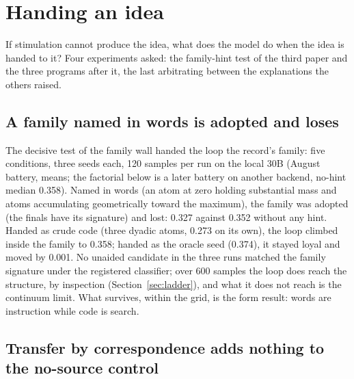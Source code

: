 \documentclass[11pt]{article}
\begin{document}
\section{Handing an idea}
\label{sec:handed}

If stimulation cannot produce the idea, what does the model do when the
idea is handed to it? Four experiments asked: the family-hint test of the
third paper and the three programs after it, the last arbitrating between
the explanations the others raised.

\subsection{A family named in words is adopted and loses}
\label{sec:hint}

The decisive test of the family wall \citep{ono2026operator} handed the
loop the record's family: five conditions, three seeds each, 120 samples
per run on the local 30B (August battery, means; the factorial below is a
later battery on another backend, no-hint median 0.358). Named in words
(an atom at zero holding substantial mass and atoms accumulating
geometrically toward the maximum), the family was adopted (the finals
have its signature) and lost: 0.327 against 0.352 without any hint. Handed
as crude code (three dyadic atoms, 0.273 on its own), the loop climbed
inside the family to 0.358; handed as the oracle seed (0.374), it stayed
loyal and moved by 0.001. No unaided candidate in the three runs matched
the family signature under the registered classifier; over 600 samples the
loop does reach the structure, by inspection (Section~\ref{sec:ladder}),
and what it does not reach is the continuum limit. What survives, within
the grid, is the form result: words are instruction while code is search.

\subsection{Transfer by correspondence adds nothing to the no-source control}
\label{sec:transfer}
\end{document}
